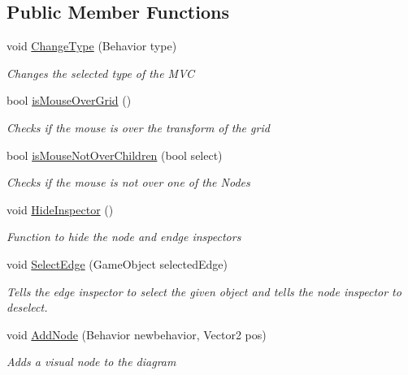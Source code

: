 \subsection*{Public Member Functions}
\begin{DoxyCompactItemize}
\item 
void \hyperlink{class_model_view_controller_a733e3f93205ae7dea9e3c643a04174ea}{Change\+Type} (Behavior type)
\begin{DoxyCompactList}\small\item\em Changes the selected type of the M\+VC \end{DoxyCompactList}\item 
bool \hyperlink{class_model_view_controller_a9eba81ca552ecca21b7d58e66b12b952}{is\+Mouse\+Over\+Grid} ()
\begin{DoxyCompactList}\small\item\em Checks if the mouse is over the transform of the grid \end{DoxyCompactList}\item 
bool \hyperlink{class_model_view_controller_a2427ee5d98caea91251c69be3a29934a}{is\+Mouse\+Not\+Over\+Children} (bool select)
\begin{DoxyCompactList}\small\item\em Checks if the mouse is not over one of the Nodes \end{DoxyCompactList}\item 
void \hyperlink{class_model_view_controller_a598a752c88bbaf0f08f18e3a26a10671}{Hide\+Inspector} ()
\begin{DoxyCompactList}\small\item\em Function to hide the node and endge inspectors \end{DoxyCompactList}\item 
void \hyperlink{class_model_view_controller_a0131bdf2b008298e97229e2c729015d4}{Select\+Edge} (Game\+Object selected\+Edge)
\begin{DoxyCompactList}\small\item\em Tells the edge inspector to select the given object and tells the node inspector to deselect. \end{DoxyCompactList}\item 
void \hyperlink{class_model_view_controller_a08958c4f615ea68ec493fbb52139646c}{Add\+Node} (Behavior newbehavior, Vector2 pos)
\begin{DoxyCompactList}\small\item\em Adds a visual node to the diagram \end{DoxyCompactList}\item 

\end{DoxyCompactItemize}
